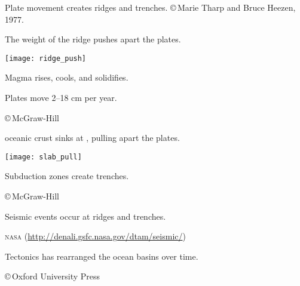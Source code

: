 \documentclass[t]{beamer}
\begin{document}
{
\begin{frame}[b]{Plate movement creates ridges and trenches.}
	\hfill \tiny \copyright\,Marie Tharp and Bruce Heezen, 1977.
\end{frame}
}
%
\begin{frame}[t]{ The weight of the ridge pushes apart the plates.}

\begin{multicols}{2}

	\texttt{[image: ridge\_push]}

\columnbreak

	\hangpara Magma rises, cools, and solidifies.

	\hangpara Plates move 2–18 cm per year.
		
\end{multicols}

	\vfilll

	\hfill \tiny \copyright\,McGraw-Hill

\end{frame}
%
\begin{frame}[t]{ oceanic crust sinks at , pulling apart the plates.}

	\vspace*{-0.5\baselineskip}

	\begin{multicols}{2}

		\texttt{[image: slab\_pull]}

	\columnbreak

		\vspace*{4\baselineskip}
	
		\hangpara Subduction zones create trenches.
	\end{multicols}

	\vfilll

	\hfill \tiny \copyright\,McGraw-Hill

\end{frame}
%
{
\begin{frame}[b]{Seismic events occur at ridges and trenches.}

	\hfill \tiny \textsc{nasa} (\url{http://denali.gsfc.nasa.gov/dtam/seismic/})

\end{frame}
}
%
{
\begin{frame}[b]{Tectonics has rearranged the ocean basins over time.}

	\hfill	\tiny \copyright\,Oxford University Press

\end{frame}
}
\end{document}
